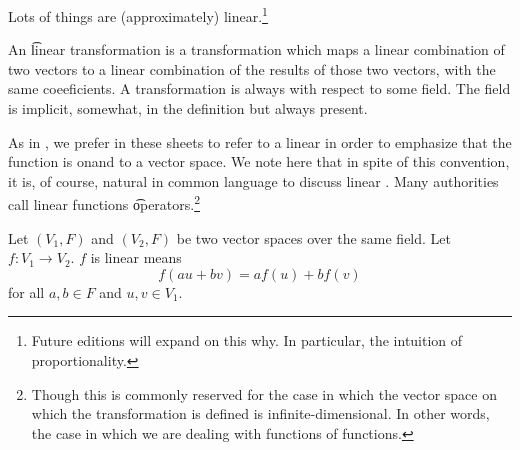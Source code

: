 

Lots of things are (approximately) linear.\footnote{Future editions will expand on this why. In particular, the intuition of proportionality.}


An \t{linear transformation} is a transformation which maps  a linear combination of two vectors to a linear combination of the results of those two vectors, with the same coeeficients.
A transformation is always  with respect to some field.
The field is implicit, somewhat, in the definition but always present.


As in , we prefer in these sheets to refer to a linear  in order to emphasize that the function is onand to a vector space.
We note here that in spite of this convention, it is, of course, natural in common language to discuss linear .
Many authorities call linear functions \t{operators}.\footnote{Though this is commonly reserved for the case in which the vector space on which the transformation is defined is infinite-dimensional. In other words, the case in which we are dealing with functions of functions.}


Let $(V_1, F)$
and $(V_2, F)$ be two
vector spaces over the
same field.
Let $f: V_1 \to V_2$.
$f$ is linear means
\[
  f(au + bv) = af(u) + bf(v)
\]
for all $a, b \in F$ and $u, v \in V_1$.
